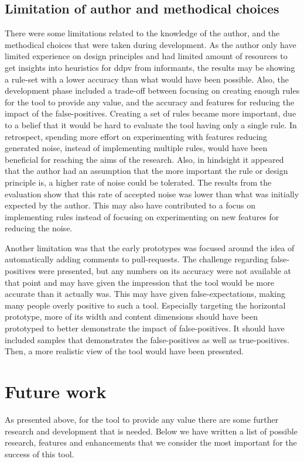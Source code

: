 \documentclass[pdftex,10pt,b5paper,twoside]{report}
\begin{document}
\subsection*{Limitation of author and methodical choices}
There were some limitations related to the knowledge of the author, and the methodical choices that were taken during development. As the author only have limited experience on design principles and had limited amount of resources to get insights into heuristics for \gls{ddpv} from informants, the results may be showing a rule-set with a lower accuracy than what would have been possible. Also, the development phase included a trade-off between focusing on creating enough rules for the tool to provide any value, and the accuracy and features for reducing the impact of the false-positives. Creating a set of rules became more important, due to a belief that it would be hard to evaluate the tool having only a single rule. In retrospect, spending more effort on experimenting with features reducing generated noise, instead of implementing multiple rules, would have been beneficial for reaching the aims of the research. Also, in hindsight it appeared that the author had an assumption that the more important the rule or design principle is, a higher rate of noise could be tolerated. The results from the evaluation show that this rate of accepted noise was lower than what was initially expected by the author. This may also have contributed to a focus on implementing rules instead of focusing on experimenting on new features for reducing the noise. 

Another limitation was that the early prototypes was focused around the idea of automatically adding comments to pull-requests. The challenge regarding false-positives were presented, but any numbers on its accuracy were not available at that point and may have given the impression that the tool would be more accurate than it actually was. This may have given false-expectations, making many people overly positive to such a tool. Especially targeting the horizontal prototype, more of its width and content dimensions should have been prototyped to better demonstrate the impact of false-positives. It should have included samples that demonstrates the false-positives as well as true-positives. Then, a more realistic view of the tool would have been presented.



\section{Future work}
 As presented above, for the tool to provide any value there are some further research and development that is needed. Below we have written a list of possible research, features and enhancements that we consider the most important for the success of this tool. 
 
\end{document}

